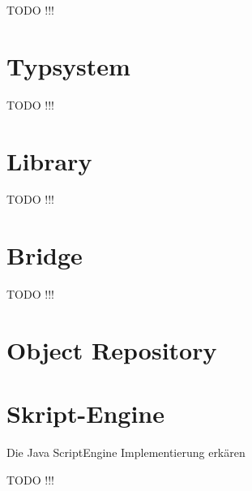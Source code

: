 TODO !!!

\section{Typsystem}

TODO !!!

\section{Library}

TODO !!!

\section{Bridge}

TODO !!!

\section{Object Repository}


\section{Skript-Engine}

Die Java ScriptEngine Implementierung erkären

TODO !!!